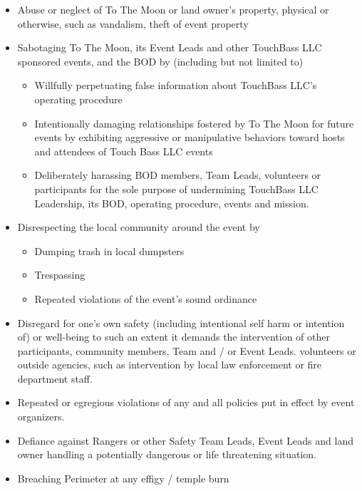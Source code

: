 \begin{multicols}{2}
\begin{itemize}[noitemsep]
    \item Abuse or neglect of To The Moon or land owner’s property, physical or otherwise, such as vandalism, theft of event property
     
    \item Sabotaging To The Moon, its Event Leads and other TouchBass LLC sponsored events, and the BOD by (including but not limited to)
    \begin{itemize}[noitemsep]
        \item Willfully perpetuating false information about TouchBass LLC’s operating procedure
        \item Intentionally damaging relationships fostered by To The Moon for future events by exhibiting aggressive or manipulative behaviors toward hosts and attendees of Touch Bass LLC events
        \item Deliberately harassing BOD members, Team Leads, volunteers or participants for the sole purpose of undermining TouchBass LLC Leadership, its BOD,  operating procedure, events and mission.  
	\end{itemize}

	\item Disrespecting the local community around the event by
    \begin{itemize}[noitemsep]
        \item Dumping trash in local dumpsters
        \item Trespassing
        \item Repeated violations of the event’s sound ordinance
    \end{itemize}

	\item Disregard for one’s own safety (including intentional self harm or intention of) or well-being to such an extent it demands the intervention of other participants, community members, Team and / or Event Leads. volunteers or outside agencies, such as intervention by local law enforcement or fire department staff.
    
	\item Repeated or egregious violations of any and all policies put in effect by event organizers.
    
    \item Defiance against Rangers or other Safety Team Leads, Event Leads and land owner handling a potentially dangerous or life threatening situation.
    
    \item Breaching Perimeter at any effigy / temple burn
\end{itemize}


\end{multicols}
